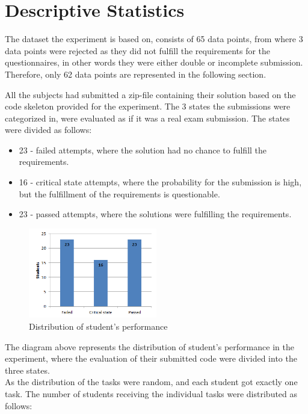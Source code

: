 \documentclass{sig-alternate-05-2015}
\begin{document}
\section{Descriptive Statistics}
The dataset the experiment is based on, consists of 65 data points, from where 3 data points were rejected as they did not fulfill the requirements for the questionnaires, in other words they were either double or incomplete submission. Therefore, only 62 data points are represented in the following section.

All the subjects had submitted a zip-file containing their solution based on the code skeleton provided for the experiment. The 3 states the submissions were categorized in, were evaluated as if it was a real exam submission.
The states were divided as follows:

\begin{itemize}
	\item 23 - failed attempts, where the solution had no chance to fulfill the requirements.
	\item 16 - critical state attempts, where the probability for the submission is high, but the fulfillment of the requirements is questionable.
	\item 23 - passed attempts, where the solutions were fulfilling the requirements.
\end{itemize}

\begin{figure}[H]
	\centering
	\includegraphics[width=0.5\textwidth]{img01}
	\caption{Distribution of student's performance}
\end{figure}

The diagram above represents the distribution of student's performance in the experiment, where the evaluation of their submitted code were divided into the three states.\\

As the distribution of the tasks were random, and each student got exactly one task. The number of students receiving the individual tasks were distributed as follows:
\end{document}
